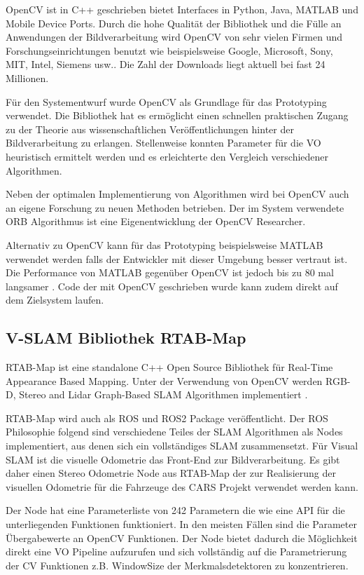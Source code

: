 OpenCV ist in C++ geschrieben bietet Interfaces in Python, Java, MATLAB und Mobile Device Ports. Durch die hohe Qualität der Bibliothek und die Fülle an Anwendungen der Bildverarbeitung wird OpenCV von sehr vielen Firmen und Forschungseinrichtungen benutzt wie beispielsweise Google, Microsoft, Sony, MIT, Intel, Siemens usw.. Die Zahl der Downloads liegt aktuell bei fast 24 Millionen.
\newline

Für den Systementwurf wurde OpenCV als Grundlage für das Prototyping verwendet. Die Bibliothek hat es ermöglicht einen schnellen praktischen Zugang zu der Theorie aus wissenschaftlichen Veröffentlichungen hinter der Bildverarbeitung zu erlangen. Stellenweise konnten Parameter für die VO heuristisch ermittelt werden und es erleichterte den Vergleich verschiedener Algorithmen.
\newline 

Neben der optimalen Implementierung von Algorithmen wird bei OpenCV auch an eigene Forschung zu neuen Methoden betrieben. Der im System verwendete ORB Algorithmus ist eine Eigenentwicklung der OpenCV Researcher. 
\newline

Alternativ zu OpenCV kann für das Prototyping beispielsweise MATLAB verwendet werden falls der Entwickler mit dieser Umgebung besser vertraut ist. Die Performance von MATLAB gegenüber OpenCV ist jedoch bis zu 80 mal langsamer \cite{cvmatlab}. Code der mit OpenCV geschrieben wurde kann zudem direkt auf dem Zielsystem laufen.

\subsection{V-SLAM Bibliothek RTAB-Map}
RTAB-Map ist eine standalone C++ Open Source Bibliothek für Real-Time Appearance Based Mapping. Unter der Verwendung von OpenCV werden RGB-D, Stereo and Lidar Graph-Based SLAM Algorithmen implementiert \cite{labbe}.
\newline

RTAB-Map wird auch als ROS und ROS2 Package veröffentlicht. Der ROS Philosophie folgend sind verschiedene Teiles der SLAM Algorithmen als Nodes implementiert, aus denen sich ein vollständiges SLAM zusammensetzt. Für Visual SLAM ist die visuelle Odometrie das Front-End zur Bildverarbeitung. Es gibt daher einen Stereo Odometrie Node aus RTAB-Map der zur Realisierung der visuellen Odometrie für die Fahrzeuge des CARS Projekt verwendet werden kann. \newline

Der Node hat eine Parameterliste von 242 Parametern die wie eine API für die unterliegenden Funktionen funktioniert. In den meisten Fällen sind die Parameter Übergabewerte an OpenCV Funktionen. Der Node bietet dadurch die Möglichkeit direkt eine VO Pipeline aufzurufen und sich vollständig auf die Parametrierung der CV Funktionen z.B. WindowSize der Merkmalsdetektoren zu konzentrieren.
